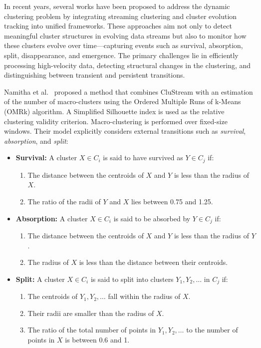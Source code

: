 In recent years, several works have been proposed to address the dynamic
clustering problem by integrating streaming clustering and cluster evolution
tracking into unified frameworks. These approaches aim not only to detect
meaningful cluster structures in evolving data streams but also to monitor how
these clusters evolve over time—capturing events such as survival, absorption,
split, disappearance, and emergence. The primary challenges lie in efficiently
processing high-velocity data, detecting structural changes in the clustering,
and distinguishing between transient and persistent transitions.

Namitha et al.~\cite{namitha_dynamic_clustering_1} proposed a method that
combines CluStream with an estimation of the number of macro-clusters using the
Ordered Multiple Runs of k-Means (OMRk) algorithm. A Simplified Silhouette
index is used as the relative clustering validity criterion. Macro-clustering
is performed over fixed-size windows. Their model explicitly considers external
transitions such as \textit{survival}, \textit{absorption}, and \textit{split}:

\begin{itemize}
    \item \textbf{Survival:} A cluster $X \in C_i$ is said to have survived as $Y \in C_j$ if:
          \begin{enumerate}
              \item The distance between the centroids of $X$ and $Y$ is less than the radius of
                    $X$.
              \item The ratio of the radii of $Y$ and $X$ lies between 0.75 and 1.25.
          \end{enumerate}

    \item \textbf{Absorption:} A cluster $X \in C_i$ is said to be absorbed by $Y \in C_j$ if:
          \begin{enumerate}
              \item The distance between the centroids of $X$ and $Y$ is less than the radius of
                    $Y$.
              \item The radius of $X$ is less than the distance between their centroids.
          \end{enumerate}

    \item \textbf{Split:} A cluster $X \in C_i$ is said to split into clusters $Y_1, Y_2, \dots$ in $C_j$ if:
          \begin{enumerate}
              \item The centroids of $Y_1, Y_2, \dots$ fall within the radius of $X$.
              \item Their radii are smaller than the radius of $X$.
              \item The ratio of the total number of points in $Y_1, Y_2, \dots$ to the number of
                    points in $X$ is between 0.6 and 1.
          \end{enumerate}
\end{itemize}

